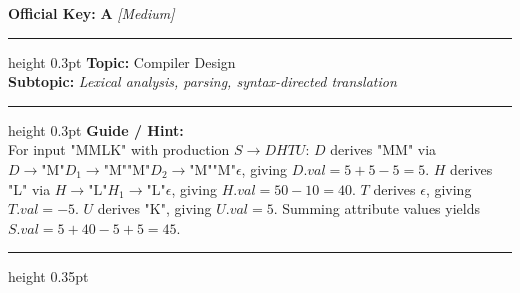 \documentclass[a4paper,10pt]{article}
\begin{document}
\begin{tcolorbox}
\textbf{Official Key:} \textbf{\large A} \hfill \textit{\small [Medium]}
\vspace{2pt}\hrule height 0.3pt\vspace{3pt}
\textbf{Topic:} Compiler Design \\
\textbf{Subtopic:} \textit{Lexical analysis, parsing, syntax-directed translation}
\vspace{2pt}\hrule height 0.3pt\vspace{3pt}
\textbf{Guide / Hint:} \\
{\small For input "MMLK" with production $S \to DHTU$: $D$ derives "MM" via $D \to \text{"M"} D_1 \to \text{"M"}\text{"M"} D_2 \to \text{"M"}\text{"M"}\epsilon$, giving $D.val = 5 + 5 - 5 = 5$. $H$ derives "L" via $H \to \text{"L"} H_1 \to \text{"L"}\epsilon$, giving $H.val = 50 - 10 = 40$. $T$ derives $\epsilon$, giving $T.val = -5$. $U$ derives "K", giving $U.val = 5$. Summing attribute values yields $S.val = 5 + 40 - 5 + 5 = 45$.}

\end{tcolorbox}
\vspace{6pt}\hrule height 0.35pt\vspace{6pt}
\noindent
\end{document}

